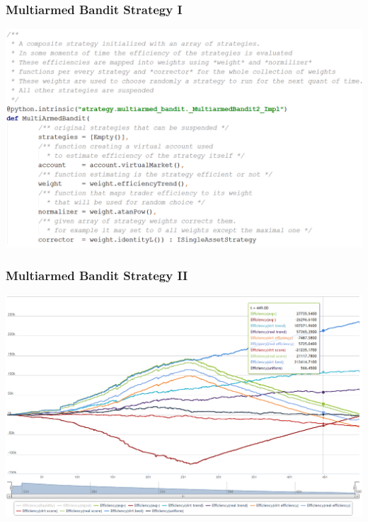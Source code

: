 \documentclass{beamer}
\begin{document}
\begin{frame}
\frametitle{Multiarmed Bandit Strategy I}
\includegraphics[width=1\linewidth]{multiarmedbandit_strategy.png}
\end{frame}
\begin{frame}
\frametitle{Multiarmed Bandit Strategy II}
\includegraphics[width=1\linewidth]{multiarmedbandit.png}
\end{frame}
\end{document}
